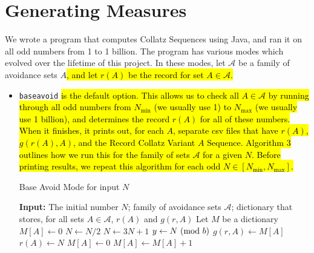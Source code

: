 \section{Generating Measures} \label{subsec:algcomp}
We wrote a program that computes Collatz Sequences using Java, and ran it on all odd numbers from 1 to 1 billion. The program has various modes which evolved over the lifetime of this project. In these modes, let $\mathcal{A}$ be a family of avoidance sets $A$\hl{, and let $r(A)$ be the record for set $A \in \mathcal{A}$.}
\begin{itemize}
\item {\tt baseavoid} \hl{is the default option. This allows us to check all $A \in \mathcal{A}$ by running through all odd numbers from $N_{\min}$ (we usually use 1) to $N_{\max}$ (we usually use 1 billion), and determines the record $r(A)$ for all of these numbers. When it finishes, it prints out, for each $A$, separate csv files that have $r(A)$, $g(r(A),A)$, and the Record Collatz Variant $A$ Sequence. Algorithm 3 outlines how we run this for the family of sets $\mathcal{A}$ for a given $N$. Before printing results, we repeat this algorithm for each odd $N \in [N_{\min}, N_{\max}]$.}
  \begin{algorithm}
    \label{alg:baseavoid}
\caption{Base Avoid Mode for input $N$}
\begin{algorithmic}[1]
    \State \textbf{Input:} The initial number $N$; family of avoidance sets $\mathcal{A}$; dictionary that stores, for all sets $A \in \mathcal{A}$,  $r(A)$ and $g(r,A)$ 
    \State Let $M$ be a dictionary
        \State $M[A] \gets 0$
    \EndFor
            \State $N \gets N/2$
        \Else       
            \State $N \gets 3N + 1$    
        \EndIf
        \State $y \gets N \ (\mathrm{mod}\ b)$
                    \State $g(r,A) \gets M[A]$
                    \State $r(A) \gets N$    
                 \EndIf
            \State $M[A] \gets 0$
            \Else
                \State $M[A] \gets M[A] + 1$
            \EndIf
        \EndFor
    \EndWhile
     
\end{algorithmic}
\end{algorithm}


\end{itemize}
